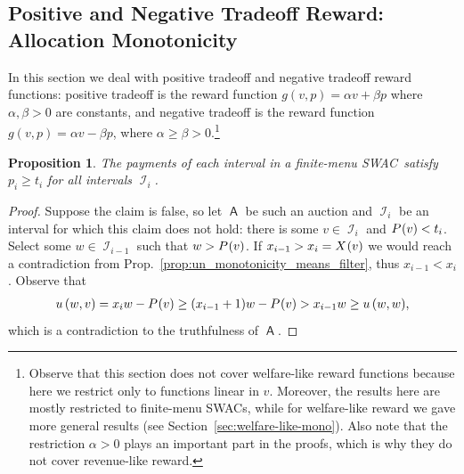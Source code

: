\documentclass[11pt,letterpaper]{article}
\newcommand{\swac}{SWAC\xspace}
\newcommand{\swacs}{SWACs\xspace}
\newcommand{\finauc}{finite-menu \swac}
\newcommand{\finaucs}{finite-menu \swacs}
\DeclareMathOperator{\A}{\auc{A}}
\DeclareMathOperator{\I}{\mathcal{I}}
\theoremstyle{plain}
\newtheorem{proposition}[theorem]{Proposition}
\newcommand{\auc}[1]{\mathsf{#1}}
\begin{document}
\subsection{Positive and Negative Tradeoff Reward: Allocation Monotonicity}

In this section we deal with positive tradeoff and negative tradeoff reward functions: positive tradeoff 
is the reward function $g(v, p) = \alpha v + \beta p$ where $\alpha, \beta > 0$ are constants, 
and negative tradeoff is the reward function $g(v,p) = \alpha v- \beta p$,
where $\alpha\geq\beta > 0$.\footnote{Observe that this section does not cover welfare-like reward functions because here we restrict only to functions linear in $v$. Moreover, the results here are mostly restricted to \finaucs, while for welfare-like reward we gave more general results (see Section~\ref{sec:welfare-like-mono}).  Also note that the restriction $\alpha>0$ plays an important part in the proofs, which is why they do not cover revenue-like reward.}

\begin{proposition}\label{prop:finauc_payments_at_least_thresh}
        The payments of each interval in a \finauc\ satisfy $p_i\geq t_i$ for all intervals $\I_i$.
\end{proposition}
\begin{proof}
    Suppose the claim is false, so let $\A$ be such an auction and $\I_i$ be an interval for which this claim does not hold: there is some $v\in\I_i$ and $\p{v}<t_i$. Select some $w\in\I_{i-1}$ such that $w>\p{v}$. If $x_{i-1}>x_{i}=\x{v}$ we would reach a contradiction from Prop.~\ref{prop:un_monotonicity_means_filter}, thus $x_{i-1}<x_i$. Observe that
    \begin{align*}
        \util{w}{v}=x_i w-\p{v}\geq(x_{i-1}+1)w-\p{v}>x_{i-1} w\geq \util{w}{w},
    \end{align*}
    which is a contradiction to the truthfulness of $\A$.
\end{proof}
\end{document}
